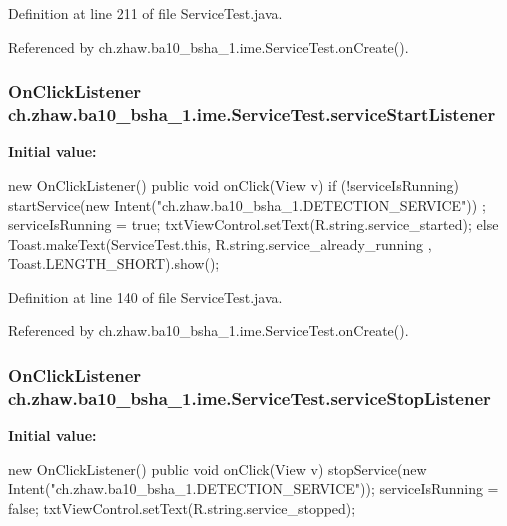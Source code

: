 Definition at line 211 of file ServiceTest.java.

Referenced by ch.zhaw.ba10\_\-bsha\_\-1.ime.ServiceTest.onCreate().\hypertarget{classch_1_1zhaw_1_1ba10__bsha__1_1_1ime_1_1ServiceTest_ac61c2027977621a45d5b68999adb3df0}{
\subsubsection[{serviceStartListener}]{\setlength{\rightskip}{0pt plus 5cm}OnClickListener {\bf ch.zhaw.ba10\_\-bsha\_\-1.ime.ServiceTest.serviceStartListener}}}
\label{classch_1_1zhaw_1_1ba10__bsha__1_1_1ime_1_1ServiceTest_ac61c2027977621a45d5b68999adb3df0}
{\bfseries Initial value:}
\begin{DoxyCode}
 new OnClickListener() {
        public void onClick(View v) {
            if (!serviceIsRunning) {
                startService(new Intent("ch.zhaw.ba10_bsha_1.DETECTION_SERVICE"))
      ;
                serviceIsRunning = true;
                txtViewControl.setText(R.string.service_started);
            } else {
                Toast.makeText(ServiceTest.this, R.string.service_already_running
      , Toast.LENGTH_SHORT).show();
            }
        }
    }
\end{DoxyCode}


Definition at line 140 of file ServiceTest.java.

Referenced by ch.zhaw.ba10\_\-bsha\_\-1.ime.ServiceTest.onCreate().\hypertarget{classch_1_1zhaw_1_1ba10__bsha__1_1_1ime_1_1ServiceTest_acf699219d38a24ed7f4de7985cbcb129}{
\subsubsection[{serviceStopListener}]{\setlength{\rightskip}{0pt plus 5cm}OnClickListener {\bf ch.zhaw.ba10\_\-bsha\_\-1.ime.ServiceTest.serviceStopListener}}}
\label{classch_1_1zhaw_1_1ba10__bsha__1_1_1ime_1_1ServiceTest_acf699219d38a24ed7f4de7985cbcb129}
{\bfseries Initial value:}
\begin{DoxyCode}
 new OnClickListener() {
        public void onClick(View v) {
            stopService(new Intent("ch.zhaw.ba10_bsha_1.DETECTION_SERVICE"));
            serviceIsRunning = false;
                txtViewControl.setText(R.string.service_stopped);
        }
    }
\end{DoxyCode}


